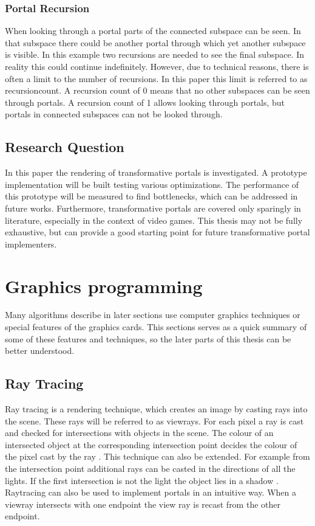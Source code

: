 \subsection{Portal Recursion}
When looking through a portal parts of the connected subspace can be seen. In that subspace there could be another portal through which yet another subspace is visible. In this example  two recursions are needed to see the final subspace. In reality this could continue indefinitely. However, due to technical reasons, there is often a limit to the number of recursions. In this paper this limit is referred to as \gls{recursioncount}. A recursion count of 0 means that no other subspaces can be seen through portals. A recursion count of 1 allows looking through portals, but portals in connected subspaces can not be looked through.

\section{Research Question}

In this paper the rendering of transformative portals is investigated. A prototype implementation will be built testing various optimizations. The performance of this prototype will be measured to find bottlenecks, which can be addressed in future works. Furthermore, transformative portals are covered only sparingly in literature, especially in the context of video games. This thesis may not be fully exhaustive, but can provide a good starting point for future transformative portal implementers.


\chapter{Graphics programming}

Many algorithms describe in later sections use computer graphics techniques or special features of the graphics cards. This sections serves as a quick summary of some of these features and techniques, so the later parts of this thesis can be better understood. 


\section{Ray Tracing}
Ray tracing is a rendering technique, which creates an image by casting rays into the scene. These rays will be referred to as \glspl{viewray}. For each pixel a ray is cast and checked for intersections with objects in the scene. The colour of an intersected object at the corresponding intersection point decides the colour of the pixel cast by the ray \cite{bungartz:2002:einfuhrung}. This technique can also be extended. For example from the intersection point additional rays can be casted in the directions of all the lights. If the first intersection is not the light the object lies in a shadow \cite{whitted:2005:improved}. Raytracing can also be used to implement portals in an intuitive way. When a \gls{viewray} intersects with one \gls{endpoint} the view ray is recast from the other \gls{endpoint}.

